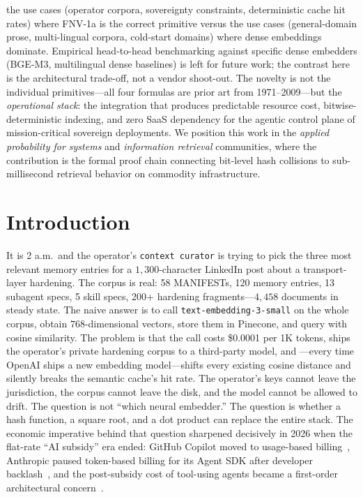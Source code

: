 \documentclass[10pt,twocolumn]{article}
\theoremstyle{definition}
\theoremstyle{remark}
\begin{document}
the use cases (operator corpora, sovereignty constraints, deterministic
cache hit rates) where FNV-1a is the correct primitive versus the use
cases (general-domain prose, multi-lingual corpora, cold-start domains)
where dense embeddings dominate. Empirical head-to-head benchmarking
against specific dense embedders (BGE-M3, multilingual dense baselines)
is left for future work; the contrast here is the architectural
trade-off, not a vendor shoot-out. The novelty is not the individual
primitives---all four formulas are prior art from 1971--2009---but the
\emph{operational stack}: the integration that produces predictable resource
cost, bitwise-deterministic indexing, and zero SaaS dependency for the
agentic control plane of mission-critical sovereign deployments. We position
this work in the \emph{applied probability for systems} and
\emph{information retrieval} communities, where the contribution is the
formal proof chain connecting bit-level hash collisions to sub-millisecond
retrieval behavior on commodity infrastructure.

\section{Introduction}
\label{sec:introduction}

It is 2 a.m.\ and the operator's \texttt{context curator} is trying to
pick the three most relevant memory entries for a $1{,}300$-character
LinkedIn post about a transport-layer hardening. The corpus is real: 58
MANIFESTs, 120 memory entries, 13 subagent specs, 5 skill specs, 200+
hardening fragments---$4{,}458$ documents in steady state. The naive answer
is to call \texttt{text-embedding-3-small} on the whole corpus, obtain
$768$-dimensional vectors, store them in Pinecone, and query with cosine
similarity. The problem is that the call costs \$0.0001 per 1K tokens,
ships the operator's private hardening corpus to a third-party model, and
---every time OpenAI ships a new embedding model---shifts every existing
cosine distance and silently breaks the semantic cache's hit rate. The
operator's keys cannot leave the jurisdiction, the corpus cannot leave the
disk, and the model cannot be allowed to drift. The question is not
``which neural embedder.'' The question is whether a hash function, a
square root, and a dot product can replace the entire stack. The economic
imperative behind that question sharpened decisively in 2026 when the
flat-rate ``AI subsidy'' era ended: GitHub Copilot moved to
usage-based billing~\citep{rodriguez2026copilot,noreika2026tokenpocalypse},
Anthropic paused token-based billing for its Agent SDK after developer
backlash~\citep{orland2026anthropic}, and the post-subsidy cost of
tool-using agents became a first-order architectural
concern~\citep{haelen2026subsidy}.
\end{document}
